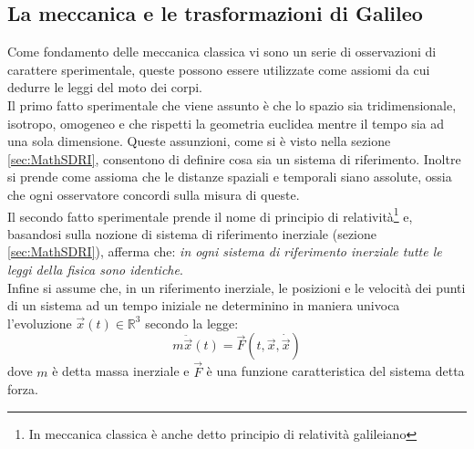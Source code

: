\subsection{La meccanica e le trasformazioni di Galileo}
Come fondamento delle meccanica classica vi sono un serie di osservazioni di carattere sperimentale, queste possono essere utilizzate come assiomi da cui dedurre le leggi del moto dei corpi.\\

Il primo fatto sperimentale che viene assunto è che lo spazio sia tridimensionale, isotropo, omogeneo e che rispetti la geometria euclidea mentre il tempo sia ad una sola dimensione. Queste assunzioni, come si è visto nella sezione \ref{sec:MathSDRI}, consentono di definire cosa sia un sistema di riferimento. Inoltre si prende come assioma che le distanze spaziali e temporali siano assolute, ossia che ogni osservatore concordi sulla misura di queste.\\

Il secondo fatto sperimentale prende il nome di principio di relatività\footnote{In meccanica classica è anche detto principio di relatività galileiano} e, basandosi sulla nozione di sistema di riferimento inerziale (sezione \ref{sec:MathSDRI}), afferma che: \emph{in ogni sistema di riferimento inerziale tutte le leggi della fisica sono identiche}.\\

Infine si assume che, in un riferimento inerziale, le posizioni e le velocità dei punti di un sistema ad un tempo iniziale ne determinino in maniera univoca l'evoluzione $\vec x(t)\in \mathbb{R}^3$ secondo la legge:
\begin{equation}
	m\ddot{\vec{x}}(t)=\vec{F}(t,\vec{x},\dot{\vec{x}})
	\label{equazioneDiNewton}
\end{equation}
dove $m$ è detta massa inerziale e $\vec{F}$ è una funzione caratteristica del sistema detta forza.\\

